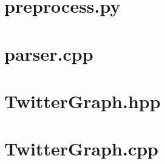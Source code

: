 \documentclass[a4paper,10pt,hidelinks]{article}
\begin{document}
\pagebreak

\appendix

\section{preprocess.py}
\label{lst:preprocess}

\pagebreak


\section{parser.cpp}



\pagebreak

\section{TwitterGraph.hpp}



\pagebreak

\section{TwitterGraph.cpp}



\pagebreak
\end{document}
